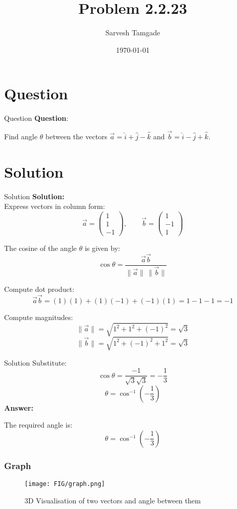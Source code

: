 \documentclass{beamer}
\title{Problem 2.2.23}
\author{Sarvesh Tamgade}
\date{\today}
\theoremstyle{remark}
\newcommand{\myvec}[1]{\ensuremath{\begin{pmatrix}#1\end{pmatrix}}}
\numberwithin{equation}{section}
\begin{document}
\begin{frame}
\titlepage
\end{frame}


\section{Question}
\begin{frame}{Question}
\textbf{Question}:


\noindent Find angle \(\theta\) between the vectors \(\vec{a} = \hat{i} + \hat{j} - \hat{k}\) and \(\vec{b} = \hat{i} - \hat{j} + \hat{k}\).
   

\end{frame}

    

\section{Solution}
\begin{frame}{Solution}
\textbf{Solution:} 
\\
Express vectors in column form:
\[
\vec{a} = \myvec{1 \\ 1 \\ -1},
\qquad
\vec{b} = \myvec{1 \\ -1 \\ 1}
\]

The cosine of the angle \(\theta\) is given by:
\[
\cos\theta = \frac{\vec{a}  \vec{b}}{\|\vec{a}\| \, \|\vec{b}\|}
\]

Compute dot product:
\[
\vec{a}  \vec{b} = (1)(1) + (1)(-1) + (-1)(1) = 1 - 1 - 1 = -1
\]

Compute magnitudes:
\[
\|\vec{a}\| = \sqrt{1^2 + 1^2 + (-1)^2} = \sqrt{3}
\]
\[
\|\vec{b}\| = \sqrt{1^2 + (-1)^2 + 1^2} = \sqrt{3}
\]


\end{frame}
\begin{frame}{Solution}
    Substitute:
\[
\cos\theta = \frac{-1}{\sqrt{3}\sqrt{3}} = -\frac{1}{3}
\]
\[
\theta = \cos^{-1}\left(-\frac{1}{3}\right)
\]
\vspace{2mm}
\textbf{Answer:}

The required angle is:
\[
\boxed{\theta = \cos^{-1}\left(-\frac{1}{3}\right)}
\]
\end{frame}
\begin{frame}
    \frametitle{Graph}
    \begin{figure}[h!]
        \centering
        \texttt{[image: FIG/graph.png]}
        \caption{3D Visualisation of two vectors and angle between them}
    \end{figure}
\end{frame}
\end{document}
